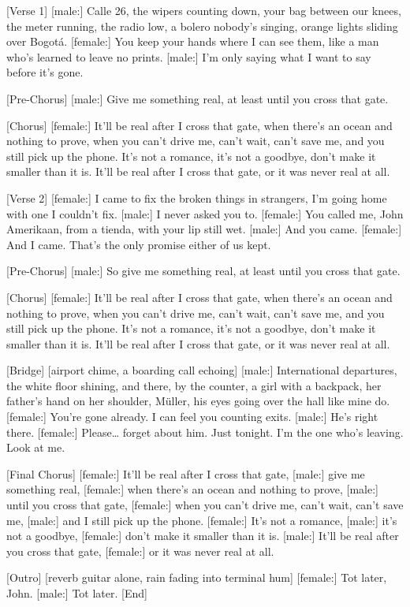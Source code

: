 \begin{lyrics}

[Verse 1]
[male:]
Calle 26, the wipers counting down,
your bag between our knees, the meter running,
the radio low, a bolero nobody's singing,
orange lights sliding over Bogotá.
[female:]
You keep your hands where I can see them,
like a man who's learned to leave no prints.
[male:]
I'm only saying what I want to say before it's gone.

[Pre-Chorus]
[male:]
Give me something real,
at least until you cross that gate.

[Chorus]
[female:]
It'll be real after I cross that gate,
when there's an ocean and nothing to prove,
when you can't drive me, can't wait, can't save me,
and you still pick up the phone.
It's not a romance, it's not a goodbye,
don't make it smaller than it is.
It'll be real after I cross that gate,
or it was never real at all.

[Verse 2]
[female:]
I came to fix the broken things in strangers,
I'm going home with one I couldn't fix.
[male:]
I never asked you to.
[female:]
You called me, John Amerikaan,
from a tienda, with your lip still wet.
[male:]
And you came.
[female:]
And I came.
That's the only promise either of us kept.

[Pre-Chorus]
[male:]
So give me something real,
at least until you cross that gate.

[Chorus]
[female:]
It'll be real after I cross that gate,
when there's an ocean and nothing to prove,
when you can't drive me, can't wait, can't save me,
and you still pick up the phone.
It's not a romance, it's not a goodbye,
don't make it smaller than it is.
It'll be real after I cross that gate,
or it was never real at all.

[Bridge]
[airport chime, a boarding call echoing]
[male:]
International departures, the white floor shining,
and there, by the counter, a girl with a backpack,
her father's hand on her shoulder, Müller,
his eyes going over the hall like mine do.
[female:]
You're gone already. I can feel you counting exits.
[male:]
He's right there.
[female:]
Please… forget about him.
Just tonight.
I'm the one who's leaving.
Look at me.

[Final Chorus]
[female:]
It'll be real after I cross that gate,
[male:]
give me something real,
[female:]
when there's an ocean and nothing to prove,
[male:]
until you cross that gate,
[female:]
when you can't drive me, can't wait, can't save me,
[male:]
and I still pick up the phone.
[female:]
It's not a romance,
[male:]
it's not a goodbye,
[female:]
don't make it smaller than it is.
[male:]
It'll be real after you cross that gate,
[female:]
or it was never real at all.

[Outro]
[reverb guitar alone, rain fading into terminal hum]
[female:]
Tot later, John.
[male:]
Tot later.
[End]
\end{lyrics}

